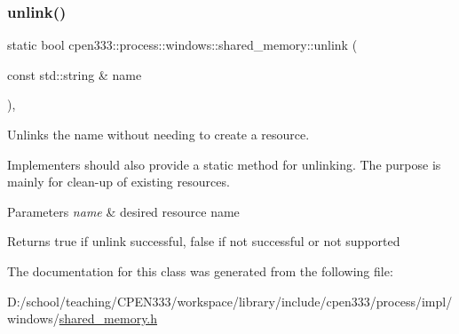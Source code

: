 \subsubsection{\texorpdfstring{unlink()}{unlink()}\hspace{0.1cm}{\footnotesize\ttfamily [2/2]}}
{\footnotesize\ttfamily static bool cpen333\+::process\+::windows\+::shared\+\_\+memory\+::unlink (\begin{DoxyParamCaption}\item[{const std\+::string \&}]{name }\end{DoxyParamCaption})\hspace{0.3cm}{\ttfamily [inline]}, {\ttfamily [static]}}



Unlinks the name without needing to create a resource. 

Implementers should also provide a static method for unlinking. The purpose is mainly for clean-\/up of existing resources.


\begin{DoxyParams}{Parameters}
{\em name} & desired resource name \\
\hline
\end{DoxyParams}
\begin{DoxyReturn}{Returns}
{\ttfamily true} if unlink successful, {\ttfamily false} if not successful or not supported 
\end{DoxyReturn}


The documentation for this class was generated from the following file\+:\begin{DoxyCompactItemize}
\item 
D\+:/school/teaching/\+C\+P\+E\+N333/workspace/library/include/cpen333/process/impl/windows/\hyperlink{impl_2windows_2shared__memory_8h}{shared\+\_\+memory.\+h}\end{DoxyCompactItemize}
